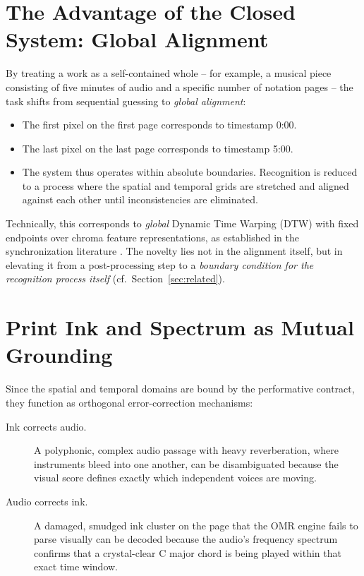 \documentclass[11pt,a4paper]{article}
\begin{document}
\section{The Advantage of the Closed System: Global Alignment}

By treating a work as a self-contained whole -- for example, a musical piece consisting of five minutes of audio and a specific number of notation pages -- the task shifts from sequential guessing to \emph{global alignment}:

\begin{itemize}
  \item The first pixel on the first page corresponds to timestamp 0:00.
  \item The last pixel on the last page corresponds to timestamp 5:00.
  \item The system thus operates within absolute boundaries. Recognition is reduced to a process where the spatial and temporal grids are stretched and aligned against each other until inconsistencies are eliminated.
\end{itemize}

Technically, this corresponds to \emph{global} Dynamic Time Warping (DTW) with fixed endpoints over chroma feature representations, as established in the synchronization literature \cite{muller2021fmp,thomas2012,sync2021}. The novelty lies not in the alignment itself, but in elevating it from a post-processing step to a \emph{boundary condition for the recognition process itself} (cf.\ Section~\ref{sec:related}).

\section{Print Ink and Spectrum as Mutual Grounding}

Since the spatial and temporal domains are bound by the performative contract, they function as orthogonal error-correction mechanisms:

\begin{description}
  \item[Ink corrects audio.] A polyphonic, complex audio passage with heavy reverberation, where instruments bleed into one another, can be disambiguated because the visual score defines exactly which independent voices are moving.
  \item[Audio corrects ink.] A damaged, smudged ink cluster on the page that the OMR engine fails to parse visually can be decoded because the audio's frequency spectrum confirms that a crystal-clear C major chord is being played within that exact time window.
\end{description}
\end{document}
